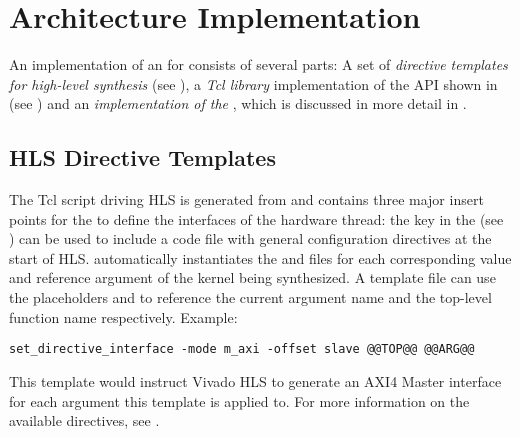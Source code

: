 \section{Architecture Implementation}\label{sec:architecture-implementation}%
An implementation of an  for \tapasco{} consists of several parts:
A set of \emph{directive templates for high-level synthesis} (see ), a \emph{Tcl library} implementation of the API shown in  (see ) and an \emph{implementation of the }, which is discussed in more detail in .
%
\subsection{HLS Directive Templates}\label{sec:ai-hls}%
The Tcl script driving HLS is generated from  and contains three major insert points for the  to define the interfaces of the hardware thread:
the key  in the  (see ) can be used to include a code file with general configuration directives at the start of HLS.
\tapasco{} automatically instantiates the  and  files for each corresponding value and reference argument of the kernel being synthesized.
A template file can use the placeholders  and  to reference the current argument name and the top-level function name respectively.
Example:
%
\begin{lstlisting}[language={[TemplateTcl]Tcl}]
set_directive_interface -mode m_axi -offset slave @@TOP@@ @@ARG@@
\end{lstlisting}
%
This template would instruct Vivado HLS to generate an AXI4 Master interface for each argument this template is applied to.
For more information on the available directives, see \cite{ug902}.

